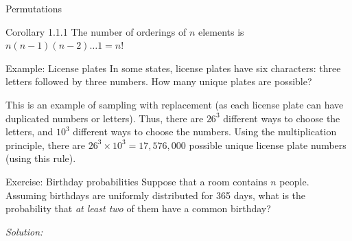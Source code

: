 \begin{frame}[allowframebreaks]{Permutations}
  \begin{block}{Corollary 1.1.1}
    The number of orderings of $n$ elements is $n(n-1)(n-2)\ldots 1 = n!$
  \end{block}
  
  \begin{exampleblock}{Example: License plates}
    In some states, license plates have six characters: three letters followed by three numbers. How many unique plates are possible?
    
    This is an example of sampling with replacement (as each license plate can have duplicated numbers or letters). Thus, there are $26^3$ different ways to choose the letters, and $10^3$ different ways to choose the numbers. Using the multiplication principle, there are $26^3 \times 10^3 = 17,576,000$ possible unique license plate numbers (using this rule).
  \end{exampleblock}
  
  \begin{exampleblock}{Exercise: Birthday probabilities}
    Suppose that a room contains $n$ people. Assuming birthdays are uniformly distributed for 365 days, what is the probability that \emph{at least two} of them have a common birthday?
  \end{exampleblock}
  
  \emph{Solution:} 
  
\end{frame}
